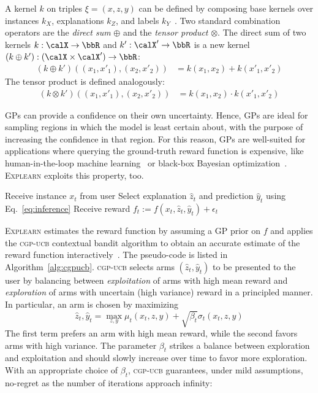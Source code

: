 \documentclass[letterpaper]{article} %
\newcommand{\explearn}{\textsc{Explearn}\xspace}
\newcommand{\cgpucb}{\textsc{cgp-ucb}\xspace}
\begin{document}
A kernel $k$ on triples $\xi = (x, z, y)$ can be defined by composing base kernels over instances $k_X$, explanations $k_Z$, and labels $k_Y$~\cite{krause2011contextual}.  Two standard combination operators are the \emph{direct sum} $\oplus$ and the \emph{tensor product} $\otimes$.  The direct sum of two kernels $k: \calX \to \bbR$ and $k': \calX' \to \bbR$ is a new kernel $(k \oplus k'): (\calX \times \calX') \to \bbR$:
%
\begin{align}
    (k \oplus k')((x_1, x'_1), (x_2, x'_2))
        & = k(x_1,x_2) + k(x'_1, x'_2)
        \label{eq:kernelsum}
\end{align}
%
The tensor product is defined analogously:
%
\begin{align}
    (k \otimes k')((x_1, x'_1), (x_2, x'_2))
        & = k(x_1,x_2) \cdot k(x'_1, x'_2)
    \label{eq:kernelprod}
\end{align}

GPs can provide a confidence on their own uncertainty. Hence, GPs are ideal for sampling regions in which the model is least certain about, with the purpose of increasing the confidence in that region. For this reason, GPs are well-suited for applications where querying the ground-truth reward function is expensive, like human-in-the-loop machine learning~\cite{guo2010gaussian} or black-box Bayesian optimization~\cite{thornton2013auto}.  \explearn exploits this property, too.

\begin{algorithm}[t]
    \caption{The \explearn algorithm}
    \label{alg:cgpucb}
    \begin{algorithmic}[1]
            \State Receive instance $x_t$ from user
            \State Select explanation $\hat{z}_t$ and prediction $\hat{y}_t$ using Eq.~\ref{eq:inference} \label{eq:play}
            \State Receive reward $f_t := f(x_t, \hat{z}_t, \hat{y}_t) + \epsilon_t$
        \EndFor
    \end{algorithmic}
\end{algorithm}

\explearn estimates the reward function by assuming a GP prior on $f$ and applies the \cgpucb contextual bandit algorithm to obtain an accurate estimate of the reward function interactively~\cite{krause2011contextual}.  The pseudo-code is listed in Algorithm~\ref{alg:cgpucb}.  \cgpucb selects arms $(\hat{z}_t, \hat{y}_t)$ to be presented to the user by balancing between \emph{exploitation} of arms with high mean reward and \emph{exploration} of arms with uncertain (high variance) reward in a principled manner.  In particular, an arm is chosen by maximizing
\[
    \textstyle
    \hat{z}_t, \hat{y}_t = \max_{z, y} \mu_t(x_t, z, y) + \sqrt{\beta_t} \sigma_t(x_t, z, y)
    \label{eq:inference}
\]
%
The first term prefers an arm with high mean reward, while the second  favors arms with high variance. The parameter $\beta_t$ strikes a balance between exploration and exploitation and should slowly increase over time to favor more exploration. With an appropriate choice of $\beta_t$, \cgpucb guarantees, under mild assumptions, no-regret as the number of iterations approach infinity: 
\end{document}

